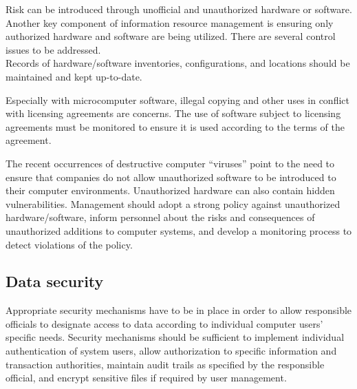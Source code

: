 \begin{htmllist}
    
    Risk can be introduced through unofficial and unauthorized hardware or
    software. Another key component of information resource management is
    ensuring only authorized hardware and software are being utilized.
    There are several control issues to be addressed.\\
    
    Records of hardware/software inventories, configurations, and locations
    should be maintained and kept up-to-date.


    
    Especially with microcomputer software, illegal copying and other uses
    in conflict with licensing agreements are concerns. The use of software
    subject to licensing agreements must be monitored to ensure it is used
    according to the terms of the agreement.


    
    The recent occurrences of destructive computer ``viruses'' point to the
    need to ensure that companies do not allow unauthorized software to be
    introduced to their computer environments. Unauthorized hardware can
    also contain hidden vulnerabilities. Management should adopt a strong
    policy against unauthorized hardware/software, inform personnel about
    the risks and consequences of unauthorized additions to computer
    systems, and develop a monitoring process to detect violations of the
    policy.
\end{htmllist}

\subsection{Data security}
Appropriate security mechanisms have to be in place in order to allow
responsible officials to designate access to data according to
individual computer users' specific needs. Security mechanisms should
be sufficient to implement individual authentication of system users,
allow authorization to specific information and transaction
authorities, maintain audit trails as specified by the responsible
official, and encrypt sensitive files if required by user management.


